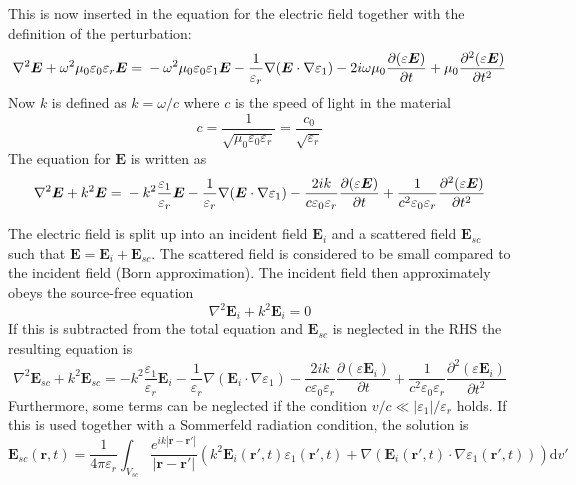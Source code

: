 \documentclass[10pt,a4paper]{eitExjobb}
\begin{document}
	This is now inserted in the equation for the electric field together with the definition of the perturbation:
	\begin{equation*}
	\nabla^2\bm{E} + \omega^2 \mu_0 \varepsilon_0 \varepsilon_r \bm{E} = \\
	-\omega^2 \mu_0 \varepsilon_0 \varepsilon_1 \bm{E} -\frac{1}{\varepsilon_r}\nabla(\bm{E} \cdot \nabla \varepsilon_1) - 2i\omega \mu_0 \frac{\partial (\varepsilon \bm{E})}{\partial t} + \mu_0 \frac{\partial^2 (\varepsilon \bm{E})}{\partial t^2}
	\end{equation*}
	Now $k$ is defined as $k = \omega/c$ where $c$ is the speed of light in the material
	\begin{equation*}
	c = \frac{1}{\sqrt{\mu_0 \varepsilon_0 \varepsilon_r}} = \frac{c_0}{\sqrt{\varepsilon_r}}
	\end{equation*}
	The equation for $\bm{E}$ is written as
	\begin{equation*}
		\nabla^2\bm{E} + k^2 \bm{E} = \\
		-k^2 \frac{\varepsilon_1}{\varepsilon_r} \bm{E} -\frac{1}{\varepsilon_r}\nabla(\bm{E} \cdot \nabla \varepsilon_1) - \frac{2ik}{c\varepsilon_0\varepsilon_r} \frac{\partial (\varepsilon \bm{E})}{\partial t} + \frac{1}{c^2 \varepsilon_0 \varepsilon_r} \frac{\partial^2 (\varepsilon \bm{E})}{\partial t^2}
	\end{equation*}

	The electric field is split up into an incident field $\bm{E}_i$ and a scattered field $\bm{E}_{sc}$ such that $\bm{E} = \bm{E}_i + \bm{E}_{sc}$. The scattered field is considered to be small compared to the incident field (Born approximation). The incident field then approximately obeys the source-free equation
	\begin{equation*}
	\nabla^2 \bm{E}_{i} + k^2 \bm{E}_{i} = 0
	\end{equation*}
	If this is subtracted from the total equation and $\bm{E}_{sc}$ is neglected in the RHS the resulting equation is
	\begin{equation*}
	\nabla^2\bm{E}_{sc} + k^2 \bm{E}_{sc} =	-k^2 \frac{\varepsilon_1}{\varepsilon_r} \bm{E}_i -\frac{1}{\varepsilon_r}\nabla(\bm{E}_i \cdot \nabla \varepsilon_1) - \frac{2ik}{c\varepsilon_0\varepsilon_r} \frac{\partial (\varepsilon \bm{E}_i)}{\partial t} + \frac{1}{c^2 \varepsilon_0 \varepsilon_r} \frac{\partial^2 (\varepsilon \bm{E}_i)}{\partial t^2}
	\end{equation*}
	Furthermore, some terms can be neglected if the condition $v/c \ll |\varepsilon_1|/\varepsilon_r$ holds. If this is used together with a Sommerfeld radiation condition, the solution is
	\begin{equation*}
	\boxed{
		\bm{E}_{sc}(\bm{r},t) = \frac{1}{4\pi\varepsilon_r} \int_{V_{sc}} \frac{e^{ik |\bm{r}-\bm{r'}| }}{ |\bm{r}-\bm{r'}|} \left( k^2 \bm{E}_i (\bm{r'},t) \varepsilon_1 (\bm{r'},t) + \nabla (\bm{E}_i (\bm{r'},t) \cdot \nabla \varepsilon_1 (\bm{r'},t)) \right) \mathrm{d}v'
	}
	\end{equation*}
	
\end{document}
